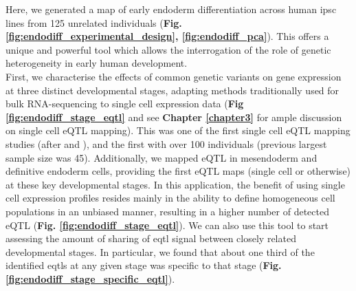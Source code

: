 

Here, we generated a map of early endoderm differentiation across human \gls{ipsc} lines from 125 unrelated individuals  (\textbf{Fig. \ref{fig:endodiff_experimental_design}, \ref{fig:endodiff_pca}}).
This offers a unique and powerful tool which allows the interrogation of the role of genetic heterogeneity in early human development. \\

First, we characterise the effects of common genetic variants on gene expression at three distinct developmental stages, adapting methods traditionally used for bulk RNA-sequencing to single cell expression data (\textbf{Fig \ref{fig:endodiff_stage_eqtl}} and see \textbf{Chapter \ref{chapter3}} for ample discussion on single cell eQTL mapping).
This was one of the first single cell eQTL mapping studies (after \cite{wills2013single} and \cite{van2018single}), and the first with over 100 individuals (previous largest sample size was 45).
Additionally, we mapped eQTL in mesendoderm and definitive endoderm cells, providing the first eQTL maps (single cell or otherwise) at these key developmental stages. 
In this application, the benefit of using single cell expression profiles resides mainly in the ability to define homogeneous cell populations in an unbiased manner, resulting in a higher number of detected eQTL (\textbf{Fig. \ref{fig:endodiff_stage_eqtl}}).
We can also use this tool to start assessing the amount of sharing of \gls{eqtl} signal between closely related developmental stages.
In particular, we found that about one third of the identified \glspl{eqtl} at any given stage was specific to that stage (\textbf{Fig. \ref{fig:endodiff_stage_specific_eqtl}}).\\

